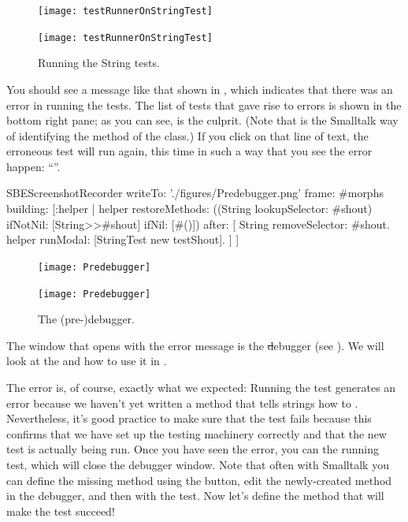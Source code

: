 \documentclass[a4paper,10pt,twoside]{book}
\begin{document}
\begin{figure}[ht]
\ifluluelse
	{\centerline {\texttt{[image: testRunnerOnStringTest]}}}
	{\centerline {\texttt{[image: testRunnerOnStringTest]}}}
\caption{Running the String tests.
\label{fig:testRunnerTestShout}}
\end{figure}

You should see a message like that shown in , which indicates that there was an error in running the tests.
The list of tests that gave rise to errors is shown in the bottom right pane; as you can see,  is the culprit.
(Note that  is the Smalltalk way of identifying the  method of the  class.)
If you click on that line of text, the erroneous test will run again, this time in such a way that you see the error happen: ``''.

\begin{ExecuteSmalltalkScript}
SBEScreenshotRecorder writeTo: './figures/Predebugger.png' frame: #morphs building: [:helper |
		helper restoreMethods: ((String lookupSelector: #shout) ifNotNil: [{String>>#shout}] ifNil: [#()]) after: [
			String removeSelector: #shout.
			helper runModal: [StringTest new testShout].
		]
]
\end{ExecuteSmalltalkScript}
\begin{figure}[hb]
	\ifluluelse
		{\centerline {\texttt{[image: Predebugger]}}}
		{\centerline {\texttt{[image: Predebugger]}}}
	\caption{The (pre-)debugger.}
	\label{fig:quicktour-predebugger}
\end{figure}

The window that opens with the error message is the \st debugger (see ).
We will look at the  and how to use it in .

The error is, of course, exactly what we expected:
Running the test generates an error because we haven't yet written a method that tells strings how to .
Nevertheless, it's good practice to make sure that the test fails because this confirms that we have set up the testing machinery correctly and that the new test is actually being run.
Once you have seen the error, you can  the running test, which will close the debugger window.
Note that often with Smalltalk you can define the missing method using the  button, edit the newly-created method in the debugger, and then  with the test.
Now let's define the method that will make the test succeed!
\end{document}
